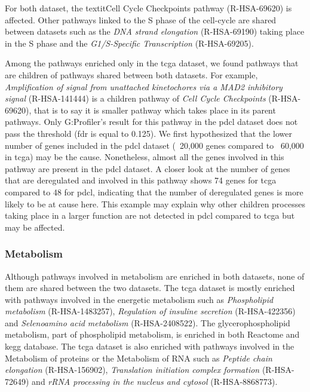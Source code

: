 For both dataset, the textit{Cell Cycle Checkpoints} pathway (R-HSA-69620) is affected.
Other pathways linked to the S phase of the cell-cycle are shared between datasets such as the \textit{DNA strand elongation} (R-HSA-69190) taking place in the S phase and the \textit{G1/S-Specific Transcription} (R-HSA-69205).

Among the pathways enriched only in the \acrshort{tcga} dataset, we found pathways that are children of pathways shared between both datasets.
For example, \textit{Amplification of signal from unattached kinetochores via a MAD2 inhibitory signal} (R-HSA-141444) is a children pathway of \textit{Cell Cycle Checkpoints} (R-HSA-69620), that is to say it is smaller pathway which takes place in its parent pathways.
Only G:Profiler's result for this pathway in the \acrshort{pdcl} dataset does not pass the threshold (\acrshort{fdr} is equal to 0.125).
We first hypothesized that the lower number of genes included in the \acrshort{pdcl} dataset (~20,000 genes compared to ~60,000 in \acrshort{tcga}) may be the cause.
Nonetheless, almost all the genes involved in this pathway are present in the \acrshort{pdcl} dataset.
A closer look at the number of genes that are deregulated and involved in this pathway shows 74 genes for \acrshort{tcga} compared to 48 for \acrshort{pdcl}, indicating that the number of deregulated genes is more likely to be at cause here.
This example may explain why other children processes taking place in a larger function are not detected in \acrshort{pdcl} compared to \acrshort{tcga} but may be affected.

\subsubsection{Metabolism}

Although pathways involved in metabolism are enriched in both datasets, none of them are shared between the two datasets.
The \acrshort{tcga} dataset is mostly enriched with pathways involved in the energetic metabolism such as \textit{Phospholipid metabolism} (R-HSA-1483257), \textit{Regulation of insuline secretion} (R-HSA-422356) and \textit{Selenoamino acid metabolism} (R-HSA-2408522).
The glycerophospholipid metabolism, part of phospholipid metabolism, is enriched in both Reactome and \acrshort{kegg} database.
The \acrshort{tcga} dataset is also enriched with pathways involved in the Metabolism of proteins or the Metabolism of RNA such as \textit{Peptide chain elongation} (R-HSA-156902), \textit{Translation initiation complex formation} (R-HSA-72649) and \textit{rRNA processing in the nucleus and cytosol} (R-HSA-8868773).

